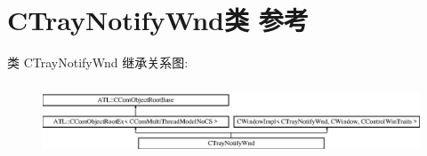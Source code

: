 \hypertarget{class_c_tray_notify_wnd}{}\section{C\+Tray\+Notify\+Wnd类 参考}
\label{class_c_tray_notify_wnd}
类 C\+Tray\+Notify\+Wnd 继承关系图\+:\begin{figure}[H]
\begin{center}
\leavevmode
\includegraphics[height=2.181818cm]{class_c_tray_notify_wnd}
\end{center}
\end{figure}
